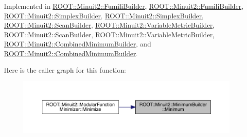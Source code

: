 Implemented in \mbox{\hyperlink{classROOT_1_1Minuit2_1_1FumiliBuilder_a6e598ea8d57750ec860595ba494bb501}{R\+O\+O\+T\+::\+Minuit2\+::\+Fumili\+Builder}}, \mbox{\hyperlink{classROOT_1_1Minuit2_1_1FumiliBuilder_aa1889039835b4117cb2a9b7d49e4f6dd}{R\+O\+O\+T\+::\+Minuit2\+::\+Fumili\+Builder}}, \mbox{\hyperlink{classROOT_1_1Minuit2_1_1SimplexBuilder_a82c52765929e3f4a41b1abe1473d4140}{R\+O\+O\+T\+::\+Minuit2\+::\+Simplex\+Builder}}, \mbox{\hyperlink{classROOT_1_1Minuit2_1_1SimplexBuilder_a68ea5d16ee89941e9674eb673dbde593}{R\+O\+O\+T\+::\+Minuit2\+::\+Simplex\+Builder}}, \mbox{\hyperlink{classROOT_1_1Minuit2_1_1ScanBuilder_ad53e9711dc8a63958845ac6e6eb5250f}{R\+O\+O\+T\+::\+Minuit2\+::\+Scan\+Builder}}, \mbox{\hyperlink{classROOT_1_1Minuit2_1_1VariableMetricBuilder_a56d18a37b8643611ff80875b91915784}{R\+O\+O\+T\+::\+Minuit2\+::\+Variable\+Metric\+Builder}}, \mbox{\hyperlink{classROOT_1_1Minuit2_1_1ScanBuilder_a24547691823b9f0977e6b23b6d084e7a}{R\+O\+O\+T\+::\+Minuit2\+::\+Scan\+Builder}}, \mbox{\hyperlink{classROOT_1_1Minuit2_1_1VariableMetricBuilder_af39ef2e38ec2bf3d94fa78fe0ed9a64a}{R\+O\+O\+T\+::\+Minuit2\+::\+Variable\+Metric\+Builder}}, \mbox{\hyperlink{classROOT_1_1Minuit2_1_1CombinedMinimumBuilder_a44282b6271b536b7fc6b80af16ac67ef}{R\+O\+O\+T\+::\+Minuit2\+::\+Combined\+Minimum\+Builder}}, and \mbox{\hyperlink{classROOT_1_1Minuit2_1_1CombinedMinimumBuilder_a5439a04b01ff94a8f790443b867d6e53}{R\+O\+O\+T\+::\+Minuit2\+::\+Combined\+Minimum\+Builder}}.

Here is the caller graph for this function\+:\nopagebreak
\begin{figure}[H]
\begin{center}
\leavevmode
\includegraphics[width=350pt]{d3/dc3/classROOT_1_1Minuit2_1_1MinimumBuilder_aefaa624436afa8195af1f3393a35981f_icgraph}
\end{center}
\end{figure}
\mbox{\label{classROOT_1_1Minuit2_1_1MinimumBuilder_aefaa624436afa8195af1f3393a35981f}} 
